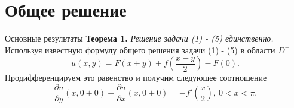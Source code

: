 \documentclass[10pt,pdf,hyperref={unicode}]{beamer}
\begin{document}
\section{Общее решение}
\begin{frame}{Основные результаты}
	\textbf{Теорема 1.} \textit{Решение задачи (1) - (5) единственно.}
	\newline
	\newline
	Используя известную формулу общего решения задачи (1) - (5) в области $D^-$ 
	\begin{equation*}
			u(x,y) = F(x+y) + f(\dfrac{x-y}{2}) - F(0).
	\end{equation*}
	Продифференцируем это равенство и получим следующее соотношение
	\begin{equation*}
		\dfrac{\partial u}{\partial y}(x, 0+0) - \dfrac{\partial u}{\partial x}(x, 0 + 0) = - f'\left(\dfrac{x}2\right), \ 0 < x < \pi. 
	\end{equation*}
\end{frame}
\end{document}
